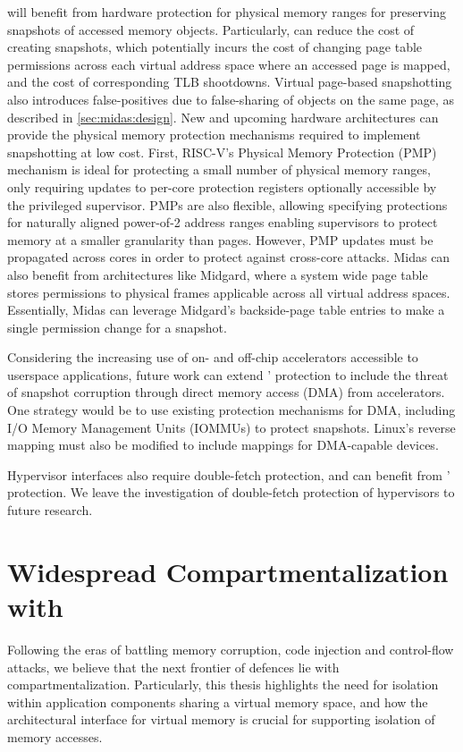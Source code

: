 \midas will benefit from hardware protection for physical memory
ranges for preserving snapshots of accessed memory objects.
Particularly, \midas can reduce the cost of creating snapshots, 
which potentially incurs the cost of changing page table 
permissions across each virtual address space where an accessed page
is mapped, and the cost of corresponding TLB shootdowns.
Virtual page-based snapshotting also introduces false-positives due to
false-sharing of objects on the same page, as described in 
\autoref{sec:midas:design}.
New and upcoming hardware architectures can provide the physical
memory protection mechanisms required to implement snapshotting at low cost.
First, RISC-V's Physical Memory Protection (PMP) mechanism is ideal for
protecting a small number of physical memory ranges, only requiring updates
to per-core protection registers optionally accessible by the privileged
supervisor. 
PMPs are also flexible, allowing specifying protections for naturally aligned
power-of-2 address ranges enabling supervisors to protect memory at a
smaller granularity than pages.
However, PMP updates must be propagated across cores in order to protect
against cross-core attacks.
Midas can also benefit from architectures like Midgard, where a system wide
page table stores permissions to physical frames applicable across all
virtual address spaces.
Essentially, Midas can leverage Midgard's backside-page table entries to
make a single permission change for a snapshot.

Considering the increasing use of on- and off-chip accelerators accessible to
userspace applications, future work can extend \midas' protection to include
the threat of snapshot corruption through direct memory access (DMA)
from accelerators.
One strategy would be to use existing protection mechanisms for DMA, including
I/O Memory Management Units (IOMMUs) to protect snapshots.
Linux's reverse mapping must also be modified to include mappings for 
DMA-capable devices.

Hypervisor interfaces also require double-fetch protection, and can benefit 
from \midas' protection.
We leave the investigation of double-fetch protection of hypervisors to future
research.

\section{Widespread Compartmentalization with \seccells}
\label{sec:conclusion:seccells}
Following the eras of battling memory corruption, code injection and 
control-flow attacks,
we believe that the next frontier of defences lie with compartmentalization.
Particularly, this thesis highlights the need for isolation within
application components sharing a virtual memory space, and how the
architectural interface for virtual memory is crucial for supporting
isolation of memory accesses.

